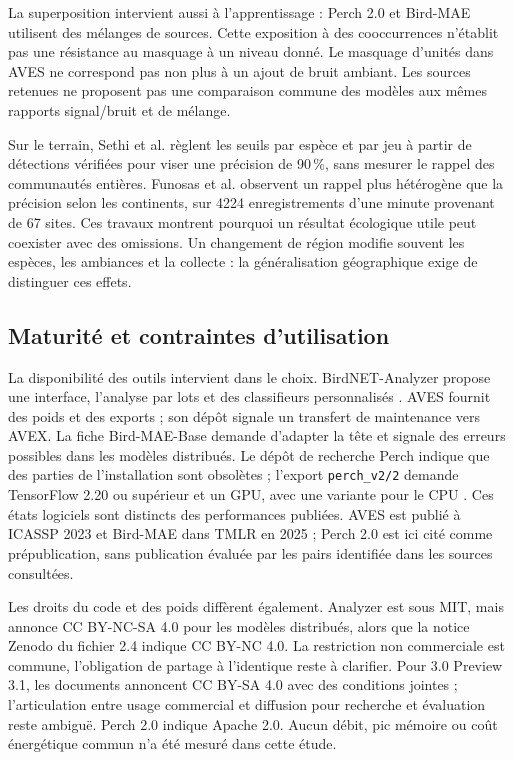 \documentclass{technology_watch}
\begin{document}
La superposition intervient aussi à l'apprentissage : Perch 2.0 et Bird-MAE
utilisent des mélanges de sources\cite{perch2025,birdmae2025}. Cette exposition
à des cooccurrences n'établit pas une résistance au masquage à un niveau donné.
Le masquage d'unités dans AVES ne correspond pas non plus à un ajout de bruit
ambiant. Les sources retenues ne proposent pas une comparaison commune des
modèles aux mêmes rapports signal/bruit et de mélange.

Sur le terrain, Sethi et al. règlent les seuils par espèce et par jeu à partir
de détections vérifiées pour viser une précision de 90\,\%, sans mesurer le
rappel des communautés entières\cite{sethi2024}. Funosas et al. observent un
rappel plus hétérogène que la précision selon les continents, sur \num{4224}
enregistrements d'une minute provenant de 67 sites\cite{funosas2026}. Ces travaux montrent
pourquoi un résultat écologique utile peut coexister avec des omissions. Un
changement de région modifie souvent les espèces, les ambiances et la collecte :
la généralisation géographique exige de distinguer ces effets.

\subsection{Maturité et contraintes d'utilisation}

La disponibilité des outils intervient dans le choix. BirdNET-Analyzer propose
une interface, l'analyse par lots et des classifieurs personnalisés
\cite{birdnetanalyzer}. AVES fournit des poids et des exports ; son dépôt
signale un transfert de maintenance vers AVEX\cite{avescode}. La fiche
Bird-MAE-Base demande d'adapter la tête et signale des erreurs possibles dans
les modèles distribués\cite{birdmaemodel}. Le dépôt de recherche Perch indique
que des parties de l'installation sont obsolètes ; l'export \texttt{perch\_v2/2}
demande TensorFlow 2.20 ou supérieur et un GPU, avec une variante pour le CPU
\cite{perchtools,perchmodel}. Ces états logiciels sont distincts des performances
publiées. AVES est publié à ICASSP 2023 et Bird-MAE dans TMLR en 2025 ; Perch 2.0
est ici cité comme prépublication, sans publication évaluée par les pairs
identifiée dans les sources consultées.

Les droits du code et des poids diffèrent également. Analyzer est sous MIT,
mais annonce CC BY-NC-SA 4.0 pour les modèles distribués, alors que la notice
Zenodo du fichier 2.4 indique CC BY-NC 4.0. La restriction non commerciale est
commune, l'obligation de partage à l'identique reste à clarifier. Pour 3.0
Preview 3.1, les documents annoncent CC BY-SA 4.0 avec des conditions jointes ;
l'articulation entre usage commercial et diffusion pour recherche et évaluation
reste ambiguë\cite{birdnet24weights,birdnet30weights,birdnet30dev}.
Perch 2.0 indique Apache 2.0\cite{perchmodel}. Aucun débit, pic mémoire ou coût
énergétique commun n'a été mesuré dans cette étude.
\end{document}
